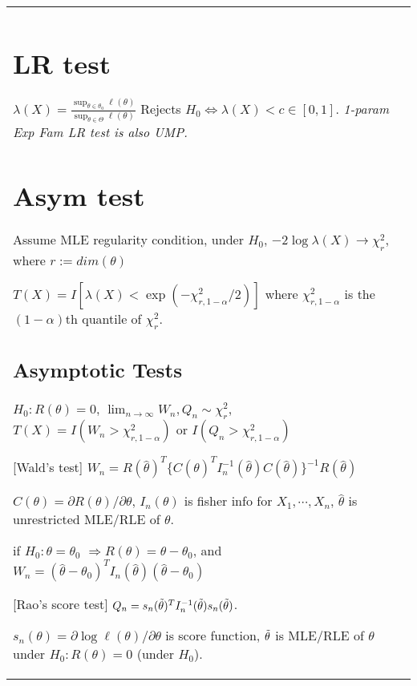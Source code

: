 \begin{tabulary}{\textwidth}{l || L}

	\section{LR test}

	$\lambda(X) = \frac{\sup_{\theta\in\theta_0} \ell(\theta)}{\sup_{\theta\in\Theta} \ell(\theta)}$
	Rejects $H_0 \Leftrightarrow \lambda(X)<c\in[0, 1]$.
	\textit{1-param Exp Fam LR test is also UMP.}

	\section{Asym test}

	Assume MLE regularity condition,
	under $H_0$, $-2\log\lambda(X)\rightarrow \chi_r^2$,
	where $r := dim(\theta)$

	$T(X) = I\left[\lambda(X)<\exp(-\chi^2_{r, 1-\alpha}/2)\right]$ where $\chi_{r, 1-\alpha}^2$ is the $(1-\alpha)$th quantile of $\chi_r^2$.


	\subsection{Asymptotic Tests}

	$H_0: R(\theta)=0$, $\lim_{n\rightarrow \infty} W_n, Q_n \sim \chi_r^2$,
	$T(X) = I(W_n > \chi_{r, 1-\alpha}^2)$ or $I(Q_n > \chi_{r, 1-\alpha}^2)$

	[Wald's test]
	$W_n = R(\hat\theta)^T \{C(\hat\theta)^T I_n^{-1}(\hat\theta) C(\hat\theta) \}^{-1} R(\hat\theta)$

	$C(\theta) = \partial R(\theta)/\partial \theta$,
	$I_n(\theta)$ is fisher info for $X_1, \cdots, X_n$,
	$\hat\theta$ is unrestricted MLE/RLE of $\theta$.

	if $H_0: \theta=\theta_0$ $\Rightarrow R(\theta) = \theta - \theta_0$, and
	$W_n = (\hat\theta - \theta_0)^T I_n(\hat\theta) (\hat\theta - \theta_0)$

	[Rao's score test]
	$Q_n=s_n(\Tilde{\theta})^T I_n^{-1}(\Tilde{\theta}) s_n(\Tilde{\theta})$.

	$s_n(\theta)=\partial\log\ell(\theta)/\partial\theta$ is score function, $\Tilde{\theta}$ is MLE/RLE of $\theta$ under $H_0: R(\theta)=0$ (under $H_0$).


\end{tabulary}


